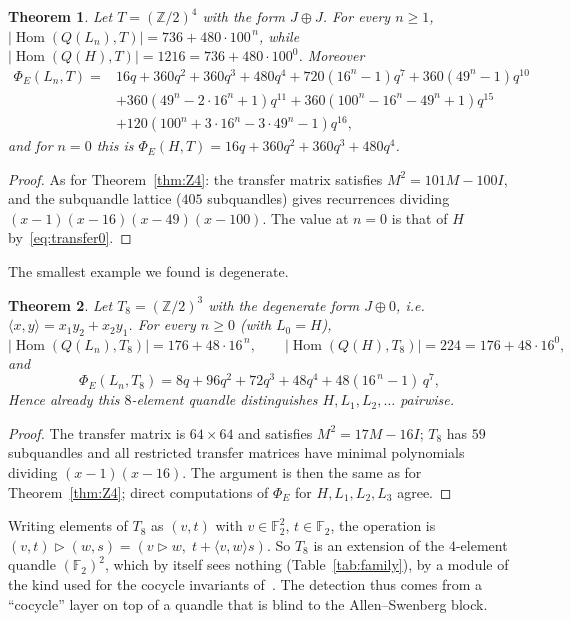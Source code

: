 \documentclass[11pt]{article}
\newtheorem{theorem}{Theorem}[section]
\theoremstyle{definition}
\newcommand{\Z}{\mathbb{Z}}
\newcommand{\F}{\mathbb{F}}
\newcommand{\Hom}{\operatorname{Hom}}
\newcommand{\tr}{\triangleright}
\newcommand{\PhiE}{\Phi_E}
\begin{document}
\begin{theorem}\label{thm:Z2^4}
Let $T=(\Z/2)^4$ with the form $J\oplus J$. For every $n\ge1$, $|\Hom(Q(L_n),T)|=736+480\cdot100^{\,n}$,
while $|\Hom(Q(H),T)|=1216=736+480\cdot100^0$. Moreover
\begin{align*}
\PhiE(L_n,T)={}&16q+360q^2+360q^3+480q^4+720(16^n-1)q^7+360(49^n-1)q^{10}\\
&+360(49^n-2\cdot16^n+1)q^{11}+360(100^n-16^n-49^n+1)q^{15}\\
&+120(100^n+3\cdot16^n-3\cdot49^n-1)q^{16},
\end{align*}
and for $n=0$ this is $\PhiE(H,T)=16q+360q^2+360q^3+480q^4$.
\end{theorem}

\begin{proof}
As for Theorem~\ref{thm:Z4}: the transfer matrix satisfies $M^2=101M-100I$, and the subquandle lattice
($405$ subquandles) gives recurrences dividing $(x-1)(x-16)(x-49)(x-100)$. The value at $n=0$ is that of
$H$ by~\eqref{eq:transfer0}.
\end{proof}

The smallest example we found is degenerate.

\begin{theorem}\label{thm:T8}
Let $T_8=(\Z/2)^3$ with the degenerate form $J\oplus0$, i.e.\ $\langle x,y\rangle=x_1y_2+x_2y_1$. For every
$n\ge0$ (with $L_0=H$),
\[
|\Hom(Q(L_n),T_8)|=176+48\cdot16^{\,n},\qquad |\Hom(Q(H),T_8)|=224=176+48\cdot16^0,
\]
and
\[
\PhiE(L_n,T_8)=8q+96q^2+72q^3+48q^4+48(16^{\,n}-1)\,q^7,
\]
Hence already this $8$-element quandle distinguishes $H,L_1,L_2,\dots$ pairwise.
\end{theorem}

\begin{proof}
The transfer matrix is $64\times64$ and satisfies $M^2=17M-16I$; $T_8$ has $59$ subquandles and all
restricted transfer matrices have minimal polynomials dividing $(x-1)(x-16)$. The argument is then the same
as for Theorem~\ref{thm:Z4}; direct computations of $\PhiE$ for $H,L_1,L_2,L_3$ agree.
\end{proof}

Writing elements of $T_8$ as $(v,t)$ with $v\in\F_2^2$, $t\in\F_2$, the operation is
$(v,t)\tr(w,s)=(v\tr w,\;t+\langle v,w\rangle s)$. So $T_8$ is an extension of the $4$-element quandle
$(\F_2)^2$, which by itself sees nothing (Table~\ref{tab:family}), by a module of the kind used for the
cocycle invariants of~\cite{CEGS05}. The detection thus comes from a ``cocycle'' layer on top of a quandle
that is blind to the Allen--Swenberg block.
\end{document}

